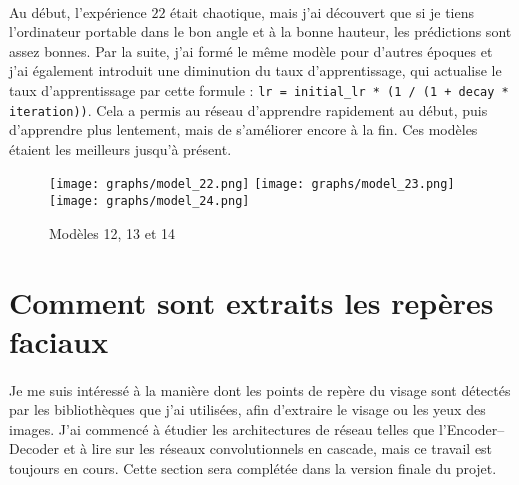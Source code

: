 \paragraph{}
Au début, l'expérience $22$ était chaotique, mais j'ai découvert que si je tiens l'ordinateur portable dans le bon angle et à la bonne hauteur, les prédictions sont assez bonnes.
Par la suite, j'ai formé le même modèle pour d'autres époques et j'ai également introduit une diminution du taux d'apprentissage, qui actualise le taux d'apprentissage par cette formule :
\lstinline{lr = initial_lr * (1 / (1 + decay * iteration))}.
Cela a permis au réseau d'apprendre rapidement au début, puis d'apprendre plus lentement, mais de s'améliorer encore à la fin.
Ces modèles étaient les meilleurs jusqu'à présent.

\begin{figure}[H]
    \centering
    \texttt{[image: graphs/model\_22.png]}
    \texttt{[image: graphs/model\_23.png]}
    \texttt{[image: graphs/model\_24.png]}
    \caption{Modèles 12, 13 et 14}
\end{figure}

\section{Comment sont extraits les repères faciaux}
\paragraph{}
Je me suis intéressé à la manière dont les points de repère du visage sont détectés par les bibliothèques que j'ai utilisées, afin d'extraire le visage ou les yeux des images.
J'ai commencé à étudier les architectures de réseau telles que l'Encoder–Decoder et à lire sur les réseaux convolutionnels en cascade, mais ce travail est toujours en cours.
Cette section sera complétée dans la version finale du projet.
